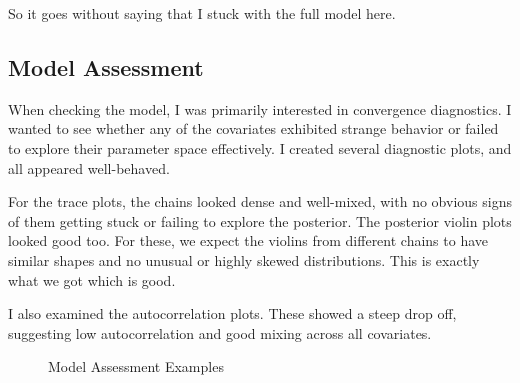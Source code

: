 So it goes without saying that I stuck with the full model here.

\subsection*{Model Assessment}

When checking the model, I was primarily interested in convergence diagnostics. I wanted to see whether any of the covariates exhibited strange behavior or failed to explore their parameter space effectively. I created several diagnostic plots, and all appeared well-behaved.

For the trace plots, the chains looked dense and well-mixed, with no obvious signs of them getting stuck or failing to explore the posterior. The posterior violin plots looked good too. For these, we expect the violins from different chains to have similar shapes and no unusual or highly skewed distributions. This is exactly what we got which is good.

I also examined the autocorrelation plots. These showed a steep drop off, suggesting low autocorrelation and good mixing across all covariates.

\begin{figure}[ht!]%
    \centering
    \qquad
    \caption{Model Assessment Examples}%
    \label{fig:example}%
\end{figure}

